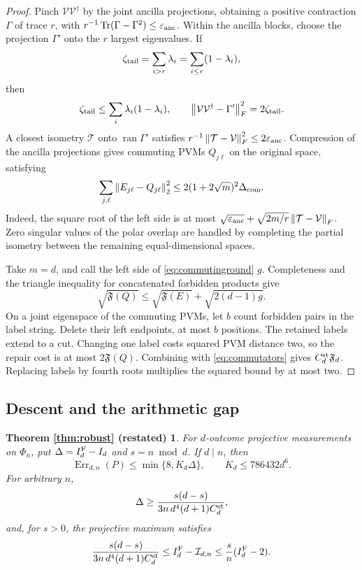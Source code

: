 \documentclass[11pt]{amsart}
\theoremstyle{remark}
\theoremstyle{plain}
\newtheorem*{robustagain}{Theorem \ref{thm:robust} (restated)}
\numberwithin{equation}{section}
\DeclareMathOperator{\Tr}{Tr}
\DeclareMathOperator{\Err}{Err}
\newcommand{\norm}[1]{\left\|#1\right\|}
\newcommand{\Fdef}{\mathfrak F_d}
\newcommand{\IF}{I_d^{\rm F}}
\newcommand{\epsanc}{\varepsilon_{\rm anc}}
\begin{document}
\begin{proof}
Pinch \(\mathcal V\mathcal V^\dagger\) by the joint ancilla
projections, obtaining a positive contraction \(\Gamma\) of trace
\(r\), with \(r^{-1}\Tr(\Gamma-\Gamma^2)\le\epsanc\).
Within the ancilla blocks, choose the projection \(\Gamma'\) onto
the \(r\) largest eigenvalues. If
\[
 \zeta_{\rm tail}=\sum_{i>r}\lambda_i
                 =\sum_{i\le r}(1-\lambda_i),
\]
then
\[
 \zeta_{\rm tail}\le\sum_i\lambda_i(1-\lambda_i),\qquad
 \norm{\mathcal V\mathcal V^\dagger-\Gamma'}_F^2
 =2\zeta_{\rm tail}.
\]
A closest isometry \(\mathcal T\) onto \(\operatorname{ran}\Gamma'\)
satisfies \(r^{-1}\norm{\mathcal T-\mathcal V}_F^2\le2\epsanc\).
Compression of the ancilla projections gives commuting PVMs
\(Q_{j\ell}\) on the original space, satisfying
\begin{equation}\label{eq:commutinground}
 \sum_{j,\ell}\norm{E_{j\ell}-Q_{j\ell}}_2^2
 \le2(1+2\sqrt m)^2\Delta_{\rm com}.
\end{equation}
Indeed, the square root of the left side is at most
\(\sqrt{\epsanc}+\sqrt{2m/r}\norm{\mathcal T-\mathcal V}_F\).
Zero singular values of the polar overlap are handled by completing
the partial isometry between the remaining equal-dimensional spaces.

Take \(m=d\), and call the left side of \eqref{eq:commutinground}
\(g\). Completeness and the triangle inequality for concatenated
forbidden products give
\[
 \sqrt{\mathfrak F(Q)}
 \le\sqrt{\mathfrak F(E)}+\sqrt{2(d-1)g}.
\]
On a joint eigenspace of the commuting PVMs, let \(b\) count forbidden
pairs in the label string. Delete their left endpoints, at most
\(b\) positions. The retained labels extend to a cut.
Changing one label costs squared PVM distance two, so the repair
cost is at most \(2\mathfrak F(Q)\).
Combining with \eqref{eq:commutators} gives
\(C_d^{\rm st}\Fdef\). Replacing labels by fourth roots multiplies
the squared bound by at most two.
\end{proof}

\subsection{Descent and the arithmetic gap}

\begin{robustagain}
For \(d\)-outcome projective measurements on \(\Phi_n\), put
\(\Delta=\IF-I_d\) and \(s=n\bmod d\).
If \(d\mid n\), then
\[
 \Err_{d,n}(P)\le\min\{8,K_d\Delta\},
 \qquad K_d\le786432d^6.
\]
For arbitrary \(n\),
\[
 \Delta\ge\frac{s(d-s)}{3n\,d^4(d+1)C_d^{\rm st}},
\]
and, for \(s>0\), the projective maximum satisfies
\[
 \frac{s(d-s)}{3n\,d^4(d+1)C_d^{\rm st}}
 \le\IF-\mathcal I_{d,n}
 \le\frac{s}{n}(\IF-2).
\]
\end{robustagain}
\end{document}
